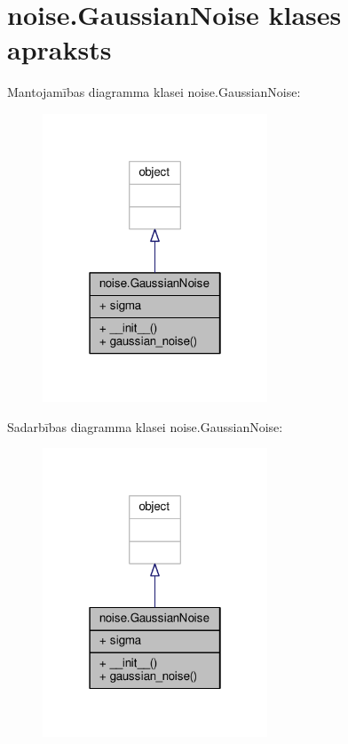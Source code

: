 \hypertarget{classnoise_1_1_gaussian_noise}{}\section{noise.\+Gaussian\+Noise klases apraksts}
\label{classnoise_1_1_gaussian_noise}


Mantojamības diagramma klasei noise.\+Gaussian\+Noise\+:
\nopagebreak
\begin{figure}[H]
\begin{center}
\leavevmode
\includegraphics[width=190pt]{classnoise_1_1_gaussian_noise__inherit__graph}
\end{center}
\end{figure}


Sadarbības diagramma klasei noise.\+Gaussian\+Noise\+:
\nopagebreak
\begin{figure}[H]
\begin{center}
\leavevmode
\includegraphics[width=190pt]{classnoise_1_1_gaussian_noise__coll__graph}
\end{center}
\end{figure}
